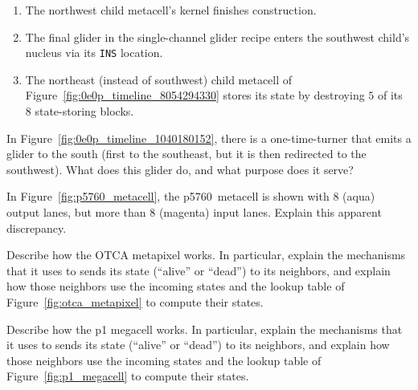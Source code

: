\begin{multicols}{2}
\begin{problem}
\begin{enumerate}[label=\bf\color{ocre}(\alph*)]
			\item The northwest child metacell's kernel finishes construction.
			
			\item The final glider in the single-channel glider recipe enters the southwest child's nucleus via its \texttt{INS} location.
			
			\item The northeast (instead of southwest) child metacell of Figure~\ref{fig:0e0p_timeline_8054294330} stores its state by destroying $5$ of its $8$ state-storing blocks.
		\end{enumerate}
	\end{problem}


	\mfilbreak
	
	
	\begin{problemstar}\label{exer:0e0p_extra_south_glider} 
		In Figure~\ref{fig:0e0p_timeline_1040180152}, there is a one-time-turner that emits a glider to the south (first to the southeast, but it is then redirected to the southwest). What does this glider do, and what purpose does it serve?
	\end{problemstar}


	\mfilbreak


	\begin{problem}\label{exer:p5760_why_magenta} 
		In Figure~\ref{fig:p5760_metacell}, the p5760~metacell is shown with $8$ (aqua) output lanes, but more than $8$ (magenta) input lanes. Explain this apparent discrepancy.
	\end{problem}
	
	
	\mfilbreak
	
	
	\begin{problem}\label{exer:explain_otca_metapixel} 
		Describe how the OTCA metapixel works. In particular, explain the mechanisms that it uses to sends its state (``alive'' or ``dead'') to its neighbors, and explain how those neighbors use the incoming states and the lookup table of Figure~\ref{fig:otca_metapixel} to compute their states.
	\end{problem}


	\mfilbreak
	
	
	\begin{problem}\label{exer:explain_p1_megacell} 
		Describe how the p1 megacell works. In particular, explain the mechanisms that it uses to sends its state (``alive'' or ``dead'') to its neighbors, and explain how those neighbors use the incoming states and the lookup table of Figure~\ref{fig:p1_megacell} to compute their states.
	\end{problem}



\end{multicols}
